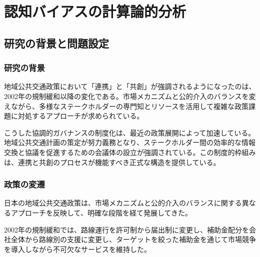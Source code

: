 
\chapter{認知バイアスの計算論的分析}
\label{chap:cognitive_bias}

\section{研究の背景と問題設定}
\label{sec:ch4_introduction}

\subsection{研究の背景}

地域公共交通政策において「連携」と「共創」が強調されるようになったのは、2002年の規制緩和以降の変化である。市場メカニズムと公的介入のバランスを変えながら、多様なステークホルダーの専門知とリソースを活用して複雑な政策課題に対処するアプローチが求められている。

こうした協調的ガバナンスの制度化は、最近の政策展開によって加速している。地域公共交通計画の策定が努力義務となり、ステークホルダー間の効率的な情報交換と協議を促進するための会議体の設立が強調されている。この制度的枠組みは、連携と共創のプロセスが機能すべき正式な構造を提供している。

\subsection{政策の変遷}

日本の地域公共交通政策は、市場メカニズムと公的介入のバランスに関する異なるアプローチを反映して、明確な段階を経て発展してきた。

2002年の規制緩和では、路線運行を許可制から届出制に変更し、補助金配分を会社全体から路線別の支援に変更し、ターゲットを絞った補助金を通じて市場競争を導入しながら不可欠なサービスを維持した。

